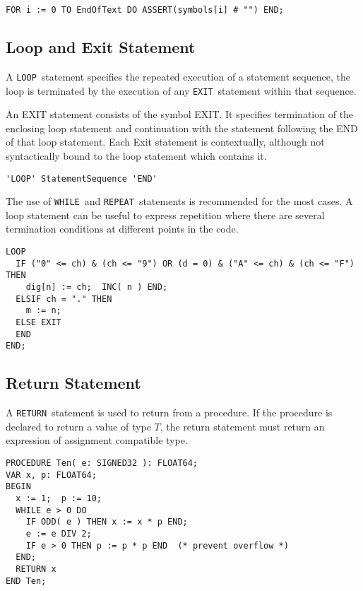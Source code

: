 \documentclass[a4wide,11pt]{article}
\newcommand{\WHILE}{\lstinline"WHILE"}
\newcommand{\REPEAT}{\lstinline"REPEAT"}
\newcommand{\LOOP}{\lstinline"LOOP"}
\newcommand{\EXIT}{\lstinline"EXIT"}
\newcommand{\RETURN}{\lstinline"RETURN"}
\begin{document}
\begin{annotation}
\begin{lstlisting}[style=example]
FOR i := 0 TO EndOfText DO ASSERT(symbols[i] # "") END;
\end{lstlisting}
\end{annotation}

\subsection{Loop and Exit Statement}
A \LOOP\ statement specifies the repeated execution of a statement sequence, the loop is terminated by the execution of any \EXIT\ statement within that sequence.



An EXIT statement consists of the symbol EXIT.
It specifies termination of the enclosing loop statement and continuation with the statement following the END of that loop statement.
Each Exit statement is contextually, although not syntactically bound to the loop statement which contains it.

\begin{lstlisting}[style=ebnf]
'LOOP' StatementSequence 'END'
\end{lstlisting}

\begin{annotation}
The use of \WHILE\ and \REPEAT\ statements is recommended for the most cases.
A loop statement can be useful to express repetition where there are several termination conditions at different points in the code.

\begin{lstlisting}[style=example]
LOOP
  IF ("0" <= ch) & (ch <= "9") OR (d = 0) & ("A" <= ch) & (ch <= "F") THEN
    dig[n] := ch;  INC( n ) END;
  ELSIF ch = "." THEN
  	m := n;
  ELSE EXIT
  END
END;
\end{lstlisting}
\end{annotation}

\subsection{Return Statement}
A \RETURN\ statement is used to return from a procedure.
If the procedure is declared to return a value of type $T$, the return statement must return an expression of assignment compatible type.

\begin{annotation}
\begin{lstlisting}[style=example]
PROCEDURE Ten( e: SIGNED32 ): FLOAT64;
VAR x, p: FLOAT64;
BEGIN
  x := 1;  p := 10;
  WHILE e > 0 DO
    IF ODD( e ) THEN x := x * p END;
    e := e DIV 2;
    IF e > 0 THEN p := p * p END  (* prevent overflow *)
  END;
  RETURN x
END Ten;
\end{lstlisting}
\end{annotation}
\end{document}

